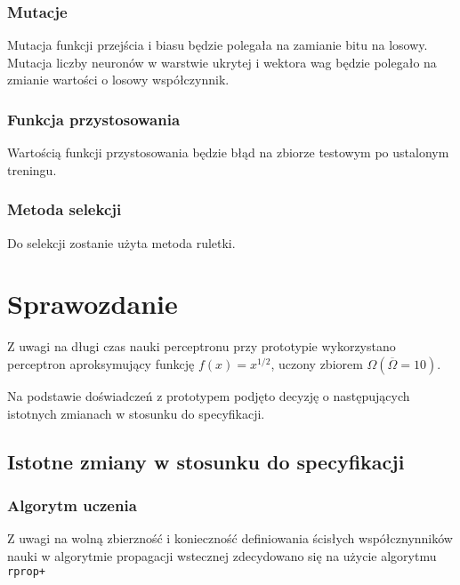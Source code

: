 \documentclass{llncs}
\begin{document}
\subsubsection{Mutacje}
Mutacja funkcji przejścia i biasu będzie polegała na zamianie bitu na losowy.
Mutacja liczby neuronów w warstwie ukrytej i wektora wag będzie polegało na zmianie
wartości o losowy współczynnik.

\subsubsection{Funkcja przystosowania}
Wartością funkcji przystosowania będzie błąd na zbiorze testowym po ustalonym treningu.

\subsubsection{Metoda selekcji}
Do selekcji zostanie użyta metoda ruletki.

\section{Sprawozdanie}

Z uwagi na długi czas nauki perceptronu przy prototypie wykorzystano perceptron aproksymujący funkcję
$f(x) = x^{1/2}$, uczony zbiorem $\Omega (\overline{\Omega} = 10)$.

Na podstawie doświadczeń z prototypem podjęto decyzję o następujących istotnych zmianach w stosunku do specyfikacji.

\subsection{Istotne zmiany w stosunku do specyfikacji}
\subsubsection{Algorytm uczenia}
Z uwagi na wolną zbierzność i konieczność definiowania ścisłych współcznynników nauki w algorytmie propagacji wstecznej
zdecydowano się na użycie algorytmu \texttt{rprop+}\cite{Riedmiller93adirect}
\end{document}
